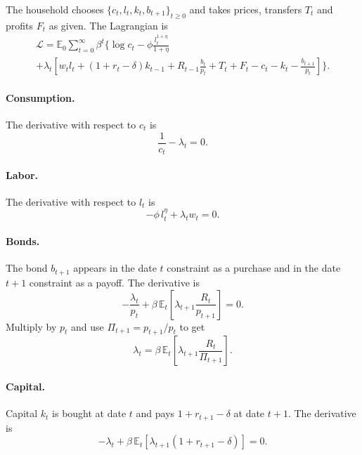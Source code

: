 \documentclass[11pt]{article}
\begin{document}
The household chooses $\{c_t, l_t, k_t, b_{t+1}\}_{t \ge 0}$ and takes prices, transfers $T_t$ and profits $F_t$ as given. The Lagrangian is
\begin{multline*}
\mathcal{L} = \mathbb{E}_0 \sum_{t=0}^{\infty} \beta^t \bigg\{ \log c_t - \phi \frac{l_t^{1+\eta}}{1+\eta} \\
+ \lambda_t \left[ w_t l_t + (1 + r_t - \delta) k_{t-1} + R_{t-1} \frac{b_t}{p_t} + T_t + F_t - c_t - k_t - \frac{b_{t+1}}{p_t} \right] \bigg\} .
\end{multline*}

\paragraph{Consumption.} The derivative with respect to $c_t$ is
\begin{equation*}
\frac{1}{c_t} - \lambda_t = 0 .
\end{equation*}

\paragraph{Labor.} The derivative with respect to $l_t$ is
\begin{equation*}
-\phi\, l_t^{\eta} + \lambda_t w_t = 0 .
\end{equation*}

\paragraph{Bonds.} The bond $b_{t+1}$ appears in the date $t$ constraint as a purchase and in the date $t+1$ constraint as a payoff. The derivative is
\begin{equation*}
-\frac{\lambda_t}{p_t} + \beta\, \mathbb{E}_t \left[ \lambda_{t+1} \frac{R_t}{p_{t+1}} \right] = 0 .
\end{equation*}
Multiply by $p_t$ and use $\Pi_{t+1} = p_{t+1}/p_t$ to get
\begin{equation*}
\lambda_t = \beta\, \mathbb{E}_t \left[ \lambda_{t+1} \frac{R_t}{\Pi_{t+1}} \right] .
\end{equation*}

\paragraph{Capital.} Capital $k_t$ is bought at date $t$ and pays $1 + r_{t+1} - \delta$ at date $t+1$. The derivative is
\begin{equation*}
-\lambda_t + \beta\, \mathbb{E}_t \left[ \lambda_{t+1} (1 + r_{t+1} - \delta) \right] = 0 .
\end{equation*}
\end{document}

